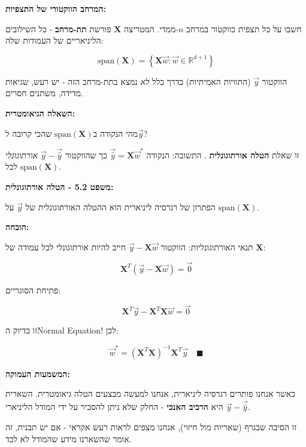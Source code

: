\textbf{המרחב הווקטורי של התצפיות:}

חשבו על כל תצפית כווקטור במרחב $n$-ממדי. המטריצה $\mathbf{X}$ פורשת \textbf{תת-מרחב} - כל השילובים הליניאריים של העמודות שלה:

\begin{equation}
\text{span}(\mathbf{X}) = \left\{ \mathbf{X}\vec{w} : \vec{w} \in \mathbb{R}^{d+1} \right\}
\end{equation}

הווקטור $\vec{y}$ (התוויות האמיתיות) בדרך כלל \textit{לא} נמצא בתת-מרחב הזה - יש רעש, שגיאות מדידה, משתנים חסרים.

\textbf{השאלה הגיאומטרית:}

מהי הנקודה ב\en{-}$\text{span}(\mathbf{X})$ שהכי קרובה ל\en{-}$\vec{y}$?

זו שאלת \textbf{הטלה אורתוגונלית} . התשובה: הנקודה $\vec{\hat{y}} = \mathbf{X}\vec{w}^*$ כך שהווקטור $\vec{y} - \vec{\hat{y}}$ \textit{אורתוגונלי} לכל $\text{span}(\mathbf{X})$.

\textbf{משפט \num{5.2} - הטלה אורתוגונלית:}

הפתרון של רגרסיה ליניארית הוא ההטלה האורתוגונלית של $\vec{y}$ על $\text{span}(\mathbf{X})$.

\textbf{הוכחה:}

תנאי האורתוגונליות: הווקטור $\vec{y} - \mathbf{X}\vec{w}$ חייב להיות אורתוגונלי לכל עמודה של $\mathbf{X}$:

\begin{equation}
\mathbf{X}^T(\vec{y} - \mathbf{X}\vec{w}) = \vec{0}
\end{equation}

פתיחת הסוגריים:

\begin{equation}
\mathbf{X}^T\vec{y} - \mathbf{X}^T\mathbf{X}\vec{w} = \vec{0}
\end{equation}

זו בדיוק ה\en{-}Normal Equation! לכן:

\begin{equation}
\vec{w}^* = (\mathbf{X}^T\mathbf{X})^{-1}\mathbf{X}^T\vec{y} \quad \blacksquare
\end{equation}

\textbf{המשמעות העמוקה:}

כאשר אנחנו פותרים רגרסיה ליניארית, אנחנו למעשה מבצעים הטלה גיאומטרית. השארית $\vec{y} - \vec{\hat{y}}$ היא \textbf{הרכיב האנכי} - החלק שלא ניתן להסביר על ידי המודל הליניארי.

זו הסיבה שבגרף  (שאריות מול חיזוי), אנחנו מצפים לראות רעש אקראי - אם יש תבנית, זה אומר שהשארנו מידע שהמודל לא לכד.

